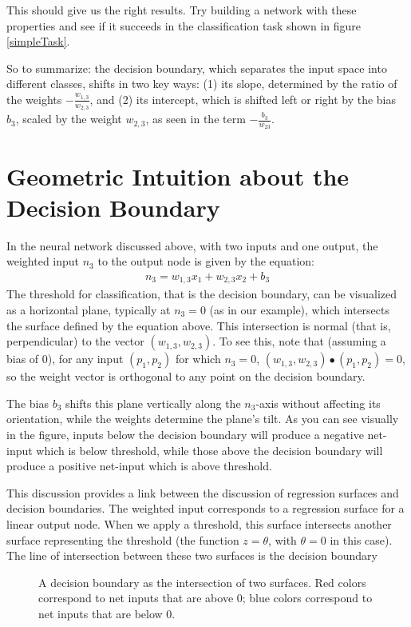 This should give us the right results. Try building a network with these properties and see if it succeeds in the classification task  shown in figure \ref{simpleTask}.

So to summarize: the decision boundary, which separates the input space into different classes, shifts in two key ways: (1) its slope, determined by the ratio of the weights $-\frac{w_{1,3}}{w_{2,3}}$, and (2) its intercept, which is shifted left or right by the bias $b_3$, scaled by the weight $w_{2,3}$, as seen in the term $-\frac{b_3}{w_{23}}$.

\section{Geometric Intuition about the Decision Boundary}


In the neural network discussed above, with two inputs and one output, the weighted input $n_3$ to the output node is given by the equation:
\begin{eqnarray*}
n_3 = w_{1,3} x_1 + w_{2,3} x_2 + b_3
\end{eqnarray*}
The threshold for classification, that is the decision boundary, can be visualized as a horizontal plane, typically at $n_3 = 0$ (as in our example), which intersects the surface defined by the equation above. This intersection is normal (that is, perpendicular) to the vector $(w_{1,3}, w_{2,3})$. To see this, note that (assuming a bias of 0), for any input $(p_1,p_2)$ for which $n_3 = 0$, $(w_{1,3}, w_{2,3}) \bullet  (p_1,p_2) = 0$, so the weight vector is orthogonal to any point on the decision boundary.

The bias $b_3$ shifts this plane vertically along the $n_3$-axis without affecting its orientation, while the weights determine the plane’s tilt. As you can see visually in the figure, inputs below the decision boundary will produce a negative net-input which is below threshold, while those above the decision boundary will produce a positive net-input which is above threshold.

This discussion provides a link between the discussion of regression surfaces and decision boundaries. The weighted input corresponds to a regression surface for a linear output node. When we apply a threshold, this surface intersects another surface representing the threshold (the function $z = \theta$, with $\theta = 0$ in this case). The line of intersection between these two surfaces is the decision boundary

\begin{figure}[h]
\centering
{}
\caption{A decision boundary as the intersection of two surfaces. Red colors correspond to net inputs that are above 0; blue colors correspond to net inputs that are below 0.}
\label{decisionLineSurface}
\end{figure}

